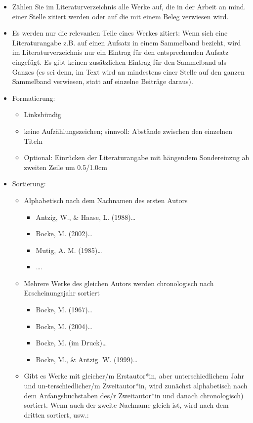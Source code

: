 \documentclass[
  letterpaper,
  DIV=11]{scrreprt}
\begin{document}
\begin{itemize}
\item
  Zählen Sie im Literaturverzeichnis alle Werke auf, die in der Arbeit
  an mind. einer Stelle zitiert werden oder auf die mit einem Beleg
  verwiesen wird.
\item
  Es werden nur die relevanten Teile eines Werkes zitiert: Wenn sich
  eine Literaturangabe z.B. auf einen Aufsatz in einem Sammelband
  bezieht, wird im Literaturverzeichnis nur ein Eintrag für den
  entsprechenden Aufsatz eingefügt. Es gibt keinen zusätzlichen Eintrag
  für den Sammelband als Ganzes (es sei denn, im Text wird an mindestens
  einer Stelle auf den ganzen Sammelband verwiesen, statt auf einzelne
  Beiträge daraus).
\item
  Formatierung:

  \begin{itemize}
  \item
    Linksbündig
  \item
    keine Aufzählungszeichen; sinnvoll: Abstände zwischen den einzelnen
    Titeln
  \item
    Optional: Einrücken der Literaturangabe mit hängendem Sondereinzug
    ab zweiten Zeile um 0.5/1.0cm
  \end{itemize}
\item
  Sortierung:

  \begin{itemize}
  \item
    Alphabetisch nach dem Nachnamen des ersten Autors

    \begin{itemize}
    \item
      Antzig, W., \& Haase, L. (1988)\ldots{}
    \item
      Bocke, M. (2002)\ldots{}
    \item
      Mutig, A. M. (1985)\ldots{}
    \item
      \ldots.
    \end{itemize}
  \item
    Mehrere Werke des gleichen Autors werden chronologisch nach
    Erscheinungsjahr sortiert

    \begin{itemize}
    \item
      Bocke, M. (1967)\ldots{}
    \item
      Bocke, M. (2004)\ldots{}
    \item
      Bocke, M. (im Druck)\ldots{}
    \item
      Bocke, M., \& Antzig. W. (1999)\ldots{}
    \end{itemize}
  \item
    Gibt es Werke mit gleicher/m Erstautor*in, aber unterschiedlichem
    Jahr und un-terschiedlicher/m Zweitautor*in, wird zunächst
    alphabetisch nach dem Anfangsbuchstaben des/r Zweitautor*in und
    danach chronologisch) sortiert. Wenn auch der zweite Nachname gleich
    ist, wird nach dem dritten sortiert, usw.:


\end{itemize}
\end{itemize}
\end{document}
